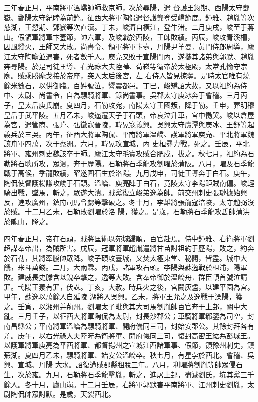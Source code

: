 \begin{pinyinscope}
 三年春正月，平南將軍溫嶠帥師救京師，次於尋陽，遣
 督護王愆期、西陽太守鄧嶽、鄱陽太守紀睦為前鋒。征西大將軍陶侃遣督護龔登受嶠節度。鐘雅、趙胤等次慈湖，王愆期、鄧嶽等次直瀆。丁未，峻濟自橫江，登牛渚。二月庚戌，峻至于蔣山。假領軍將軍卞壼節，帥六軍，及峻戰於西陵，王師敗績。丙辰，峻攻青溪柵，因風縱火，王師又大敗。尚書令、領軍將軍卞壼，丹陽尹羊曼，黃門侍郎周導，廬江太守陶瞻並遇害，死者數千人。庾亮又敗于宣陽門內，遂攜其諸弟與郭默、趙胤奔尋陽。於是司徒王導、右光祿大夫陸曄、荀崧等衛帝於太極殿，太常孔愉守宗廟。賊乘勝麾戈接於帝座，突入太后後宮，左
 右侍人皆見掠奪。是時太官唯有燒餘米數石，以供御膳。百姓號泣，響震都邑。丁巳，峻矯詔大赦，又以祖約為侍中、太尉、尚書令，自為驃騎將軍、錄尚書事。吳郡太守庾冰奔于會稽。三月丙子，皇太后庾氏崩。夏四月，石勒攻宛，南陽太守王國叛，降于勒。壬申，葬明穆皇后于武平陵。五月乙未，峻逼遷天子于石頭，帝哀泣升車，宮中慟哭。峻以倉屋為宮，遣管商、張瑾、弘徽寇晉陵，韓晃寇義興。吳興太守虞潭與庚冰、王舒等起義兵於三吳。丙午，征西大將軍陶侃、平南將軍溫嶠、護軍將軍庾亮、平北將軍魏該舟軍四萬，次于蔡洲。六月，韓晃攻宣城，內
 史桓彞力戰，死之。壬辰，平北將軍、雍州刺史魏該卒于師。廬江太守毛寶攻賊合肥戍，拔之。秋七月，祖約為石勒將石聰所攻，眾潰，奔于歷陽。石勒將石季龍攻劉曜於蒲阪。八月，曜及石季龍戰于高候，季龍敗績，曜遂圍石生於洛陽。九月戊申，司徒王導奔于白石。庚午，陶侃使督護楊謙攻峻于石頭。溫嶠、庾亮陣于白石，竟陵太守李陽距賊南偏。峻輕騎出戰，墜馬，斬之，眾遂大潰。賊黨復立峻弟逸為帥。前交州刺史張璉據始興反，進攻廣州，鎮南司馬曾勰等擊破之。冬十月，李雄將張龍寇涪陵，太守趙弼沒於賊。十二月乙未，石勒敗劉曜於洛
 陽，獲之。是歲，石勒將石季龍攻氐帥蒲洪於隴山，降之。



 四年春正月，帝在石頭，賊將匡術以苑城歸順，百官赴焉。侍中鐘雅、右衛將軍劉超謀奉帝出，為賊所害。戊辰，冠軍將軍趙胤遣將甘苗討祖約于歷陽，敗之，約奔於石勒，其將牽騰帥眾降。峻子碩攻臺城，又焚太極東堂、秘閣，皆盡。城中大饑，米斗萬錢。二月，大雨霖。丙戌，諸軍攻石頭。李陽與蘇逸戰於柤浦，陽軍敗。建威長史滕含以銳卒擊之，逸等大敗。含奉帝御於溫嶠舟，群臣頓首號泣請罪。弋陽王羕有罪，伏誅。丁亥，大赦。時兵火之後，宮闕灰燼，以建平園為宮。甲午，蘇逸以萬餘人自延陵
 湖將入吳興。乙未，將軍王允之及逸戰于溧陽，獲之。壬寅，以湘州并荊州。劉曜太子毗與其大司馬劉胤帥百官奔于上邽，關中大亂。三月壬子，以征西大將軍陶侃為太尉，封長沙郡公；車騎將軍郗鑒為司空，封南昌縣公；平南將軍溫嶠為驃騎將軍、開府儀同三司，封始安郡公。其餘封拜各有差。庚午，以右光祿大夫陸曄為衛將軍、開府儀同三司，復封高密王紘為彭城王。以護軍將軍庾亮為平西將軍、都督揚州之宣城江西諸軍事、假節，領豫州刺史，鎮蕪湖。夏四月乙未，驃騎將軍、始安公溫嶠卒。秋七月，有星孛於西北。會稽、吳興、宣城、丹陽
 大水。詔復遭賊郡縣租稅三年。八月，利曜將劉胤等帥眾侵石生，次於雍。九月，石勒將石季龍擊胤，斬之，進屠上邽，盡滅劉氏，坑其黨三千餘人。冬十月，廬山崩。十二月壬辰，右將軍郭默害平南將軍、江州刺史劉胤，太尉陶侃帥眾討默。是歲，天裂西北。




\end{pinyinscope}
